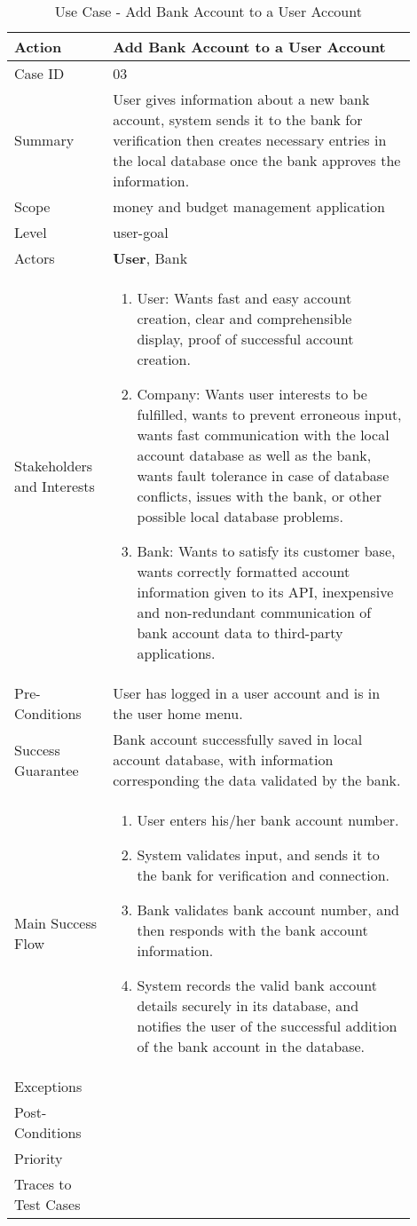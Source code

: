 \documentclass[11pt]{article}
\newcounter{use case ID}
\newcommand\tabularhead[1]{
    \begin{table}[ht]
        \addtocounter{use case ID}{1}
        \caption{Use Case \arabic{use case ID} - #1}
        \vspace{0.2cm}
        \begin{tabular}{|p{0.2\linewidth}|p{0.70\linewidth}|}
            \hline
            \textbf{Action} & \textbf{#1} \\
            \hline}
\newcommand\addrow[2]{#1 & #2\\ \hline}
\newcommand\addmulrow[2]{ \begin{minipage}[t][][t]{2.5cm}#1\end{minipage}
                &\begin{minipage}[t][][t]{11cm}
                    \begin{enumerate}[itemsep=-1ex] #2   \end{enumerate}
                \end{minipage}\vfill\\ \hline}
\newenvironment{usecase}{\tabularhead}
        {\hline\end{tabular}\end{table}}
\begin{document}
\begin{usecase}{Add Bank Account to a User Account}
    \addrow{Case ID}{03}
    \addrow{Summary}{User gives information about a new bank account, system sends it to the bank for verification then creates necessary entries in the local database once the bank approves the information.}
    \addrow{Scope}{money and budget management application}
    \addrow{Level}{user-goal}
    \addrow{Actors}{\textbf{User}, Bank}
    \addmulrow{Stakeholders and Interests}{
    \item User: Wants fast and easy account creation, clear and comprehensible display, proof of successful account creation.
    \item Company: Wants user interests to be fulfilled, wants to prevent erroneous input, wants fast communication with the local account database as well as the bank, wants fault tolerance in case of database conflicts, issues with the bank, or other possible local database problems.
    \item Bank: Wants to satisfy its customer base, wants correctly formatted account information given to its API, inexpensive and non-redundant communication of bank account data to third-party applications.}
    \addrow{Pre-Conditions}{User has logged in a user account and is in the user home menu.}
    \addrow{Success Guarantee}{Bank account successfully saved in local account database, with information corresponding the data validated by the bank.}
    \addmulrow{Main Success Flow}{
    \item User enters his/her bank account number.
    \item System validates input, and sends it to the bank for verification and connection.
    \item Bank validates bank account number, and then responds with the bank account information.
    \item System records the valid bank account details securely in its database, and notifies the user of the successful addition of the bank account in the database.}
    \addrow{Exceptions}{}
    \addrow{Post-Conditions}{}
    \addrow{Priority}{}
    \addrow{Traces to Test Cases}{}
\end{usecase}
\end{document}
